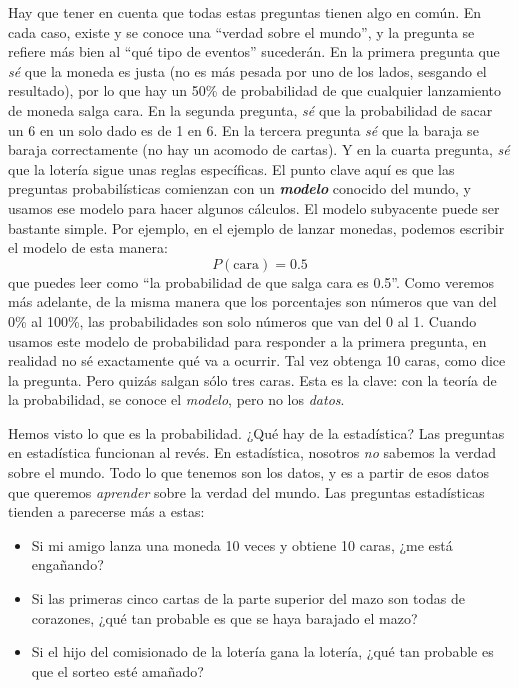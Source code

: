 \documentclass[spanish,]{book}
\providecommand{\tightlist}{%
  \setlength{\itemsep}{0pt}\setlength{\parskip}{0pt}}
\begin{document}
Hay que tener en cuenta que todas estas preguntas tienen algo en común.
En cada caso, existe y se conoce una ``verdad sobre el mundo'', y la
pregunta se refiere más bien al ``qué tipo de eventos'' sucederán. En la
primera pregunta que \emph{sé} que la moneda es justa (no es más pesada
por uno de los lados, sesgando el resultado), por lo que hay un 50\% de
probabilidad de que cualquier lanzamiento de moneda salga cara. En la
segunda pregunta, \emph{sé} que la probabilidad de sacar un 6 en un solo
dado es de 1 en 6. En la tercera pregunta \emph{sé} que la baraja se
baraja correctamente (no hay un acomodo de cartas). Y en la cuarta
pregunta, \emph{sé} que la lotería sigue unas reglas específicas. El
punto clave aquí es que las preguntas probabilísticas comienzan con un
\textbf{\emph{modelo}} conocido del mundo, y usamos ese modelo para
hacer algunos cálculos. El modelo subyacente puede ser bastante simple.
Por ejemplo, en el ejemplo de lanzar monedas, podemos escribir el modelo
de esta manera: \[
P(\mbox{cara}) = 0.5
\] que puedes leer como ``la probabilidad de que salga cara es 0.5''.
Como veremos más adelante, de la misma manera que los porcentajes son
números que van del 0\% al 100\%, las probabilidades son solo números
que van del 0 al 1. Cuando usamos este modelo de probabilidad para
responder a la primera pregunta, en realidad no sé exactamente qué va a
ocurrir. Tal vez obtenga 10 caras, como dice la pregunta. Pero quizás
salgan sólo tres caras. Esta es la clave: con la teoría de la
probabilidad, se conoce el \emph{modelo}, pero no los \emph{datos}.

Hemos visto lo que es la probabilidad. ¿Qué hay de la estadística? Las
preguntas en estadística funcionan al revés. En estadística, nosotros
\emph{no} sabemos la verdad sobre el mundo. Todo lo que tenemos son los
datos, y es a partir de esos datos que queremos \emph{aprender} sobre la
verdad del mundo. Las preguntas estadísticas tienden a parecerse más a
estas:

\begin{itemize}
\tightlist
\item
  Si mi amigo lanza una moneda 10 veces y obtiene 10 caras, ¿me está
  engañando?
\item
  Si las primeras cinco cartas de la parte superior del mazo son todas
  de corazones, ¿qué tan probable es que se haya barajado el mazo?
\item
  Si el hijo del comisionado de la lotería gana la lotería, ¿qué tan
  probable es que el sorteo esté amañado?
\end{itemize}
\end{document}
